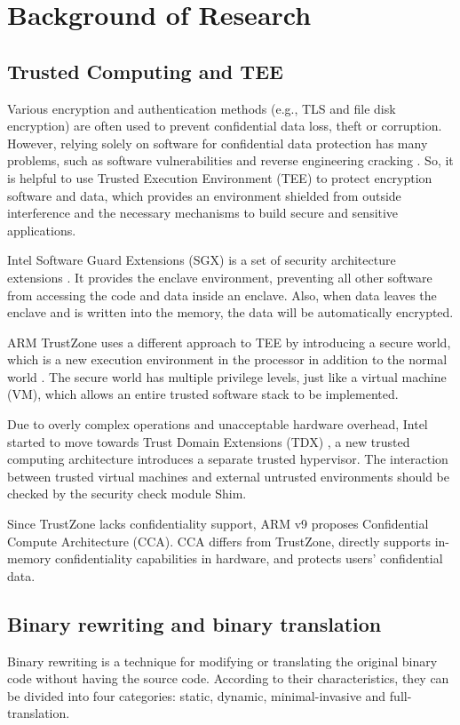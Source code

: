 \section{Background of Research}
\subsection{Trusted Computing and TEE}
Various encryption and authentication methods (e.g., TLS and file disk encryption)
are often used to prevent confidential data loss, theft or corruption.
However, relying solely on software for confidential data protection has many problems,
such as software vulnerabilities and reverse engineering cracking \cite{Zimba2021ARC}.
So, it is helpful to use Trusted Execution Environment (TEE) to protect encryption software
and data, which provides an environment shielded from outside interference and the necessary
mechanisms to build secure and sensitive applications.

Intel Software Guard Extensions (SGX) is a set of security architecture extensions
\cite{McKeen2013InnovativeIA}.
It provides the enclave environment, preventing all other software from accessing
the code and data inside an enclave. Also, when data leaves the enclave and is written
into the memory, the data will be automatically encrypted.

ARM TrustZone uses a different approach to TEE by introducing a secure world,
which is a new execution environment in the processor in addition to the normal world
\cite{Mukhtar2019ArchitecturesFS}. The secure world has multiple privilege levels,
just like a virtual machine (VM), which allows an entire trusted software stack to
be implemented.

Due to overly complex operations and unacceptable hardware overhead, Intel started to move
towards Trust Domain Extensions (TDX) \cite{Sahita2021SecurityAO, Sardar2021DemystifyingAI},
a new trusted computing architecture introduces a separate trusted hypervisor. The interaction
between trusted virtual machines and external untrusted environments should be checked by the
security check module Shim.

Since TrustZone lacks confidentiality support, ARM v9 proposes Confidential Compute Architecture (CCA).
CCA \cite{CCA} differs from TrustZone, directly supports in-memory confidentiality capabilities in hardware,
and protects users' confidential data.

\subsection{Binary rewriting and binary translation}
Binary rewriting is a technique for modifying or translating the original binary code
without having the source code. According to their characteristics, they can be divided
into four categories: static, dynamic, minimal-invasive and full-translation.

